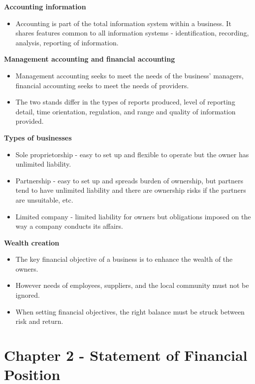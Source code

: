 \documentclass{report}
\begin{document}
\textbf{Accounting information}
\begin{itemize}
    \item Accounting is part of the total information system within a business. It shares features common to all information systems - identification, recording, analysis, reporting of information.\\
\end{itemize}

\textbf{Management accounting and financial accounting}
\begin{itemize}
    \item Management accounting seeks to meet the needs of the business' managers, financial accounting seeks to meet the needs of providers.
    \item The two stands differ in the types of reports produced, level of reporting detail, time orientation, regulation, and range and quality of information provided.\\
\end{itemize}

\textbf{Types of businesses}
\begin{itemize}
    \item Sole proprietorship - easy to set up and flexible to operate but the owner has unlimited liability.
    \item Partnership - easy to set up and spreads burden of ownership, but partners tend to have unlimited liability and there are ownership risks if the partners are unsuitable, etc.
    \item Limited company - limited liability for owners but obligations imposed on the way a company conducts its affairs.\\
\end{itemize}

\textbf{Wealth creation}
\begin{itemize}
    \item The key financial objective of a business is to enhance the wealth of the owners.
    \item However needs of employees, suppliers, and the local community must not be ignored.
    \item When setting financial objectives, the right balance must be struck between risk and return.\\
\end{itemize}

\section{Chapter 2 - Statement of Financial Position}
\end{document}
